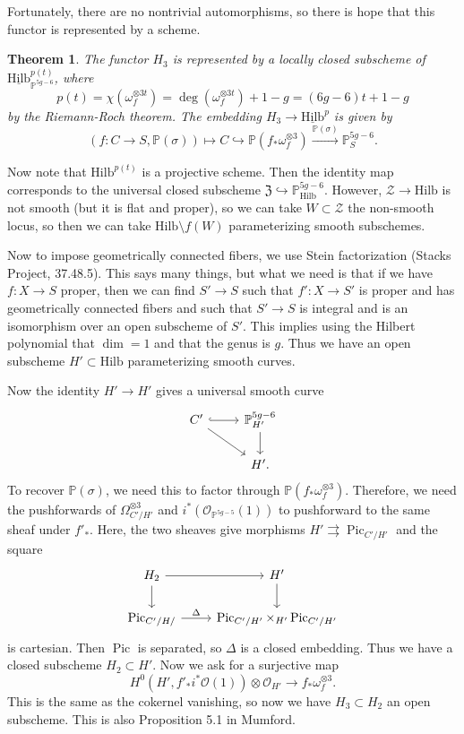 \documentclass[leqno, openany]{memoir}
\newtheorem{thm}{Theorem}[section]
\theoremstyle{definition}
\theoremstyle{remark}
\theoremstyle{plain}
\theoremstyle{definition}
\theoremstyle{remark}
\renewcommand{\P}{\mathbb{P}}
\newcommand{\mc}[1]{\mathcal{#1}}
\newcommand{\mf}[1]{\mathfrak{#1}}
\newcommand{\mr}[1]{\mathrm{#1}}
\newcommand{\ul}[1]{\underline{#1}}
\DeclareMathOperator{\Pic}{Pic}
\begin{document}
Fortunately, there are no nontrivial automorphisms, so there is hope that this functor is represented by a scheme.

\begin{thm}
    The functor $H_3$ is represented by a locally closed subscheme of $\ul{\mr{Hilb}}_{\P^{5g-6}}^{p(t)}$, where 
    \[ p(t) = \chi(\omega_f^{\otimes 3t}) = \deg(\omega_f^{\otimes 3t}) + 1 - g = (6g-6)t + 1-g\]  
    by the Riemann-Roch theorem. The embedding $H_3 \to \ul{\mr{Hilb}}^p$ is given by
    \[ (f \colon C \to S, \P(\sigma)) \mapsto C \hookrightarrow \P(f_* \omega_f^{\otimes 3}) \xrightarrow{\P(\sigma)} \P_S^{5g-6}. \]
\end{thm}

Now note that $\mr{Hilb}^{p(t)}$ is a projective scheme. Then the identity map corresponds to the universal closed subscheme $\mf{Z} \hookrightarrow \P^{5g-6}_{\mr{Hilb}}$. However, $\mc{Z} \to \mr{Hilb}$ is not smooth (but it is flat and proper), so we can take $W \subset \mc{Z}$ the non-smooth locus, so then we can take $\mr{Hilb} \setminus f(W)$ parameterizing smooth subschemes.

Now to impose geometrically connected fibers, we use Stein factorization (Stacks Project, 37.48.5). This says many things, but what we need is that if we have $f \colon X \to S$ proper, then we can find $S' \to S$ such that $f'\colon X \to S'$ is proper and has geometrically connected fibers and such that $S' \to S$ is integral and is an isomorphism over an open subscheme of $S'$. This implies using the Hilbert polynomial that $\dim = 1$ and that the genus is $g$. Thus we have an open subscheme $H' \subset \mr{Hilb}$ parameterizing smooth curves.

Now the identity $H' \to H'$ gives a universal smooth curve
\begin{equation*}
\begin{tikzcd}
    C' \arrow[hookrightarrow]{r} \arrow{dr} & \P_{H'}^{5g-6} \arrow{d} \\
                                            & H'.
\end{tikzcd}
\end{equation*}
To recover $\P(\sigma)$, we need this to factor through $\P(f_* \omega_f^{\otimes 3})$. Therefore, we need the pushforwards of $\Omega_{C'/H'}^{\otimes 3}$ and $i^*(\mc{O}_{\P^{5g-5}}(1))$ to pushforward to the same sheaf under $f'_*$. Here, the two sheaves give morphisms $H' \rightrightarrows \Pic_{C'/H'}$ and the square
\begin{equation*}
\begin{tikzcd}
    H_2 \arrow{r} \arrow{d} & H' \arrow{d} \\
    \Pic_{C'/H/} \arrow{r}{\Delta} & \Pic_{C'/H'} \times_{H'} \Pic_{C'/H'}
\end{tikzcd}
\end{equation*}
is cartesian. Then $\Pic$ is separated, so $\Delta$ is a closed embedding. Thus we have a closed subscheme $H_2 \subset H'$. Now we ask for a surjective map
\[ H^0(H', f'_* i^* \mc{O}(1)) \otimes \mc{O}_{H'} \to f_* \omega_f^{\otimes 3}. \]
This is the same as the cokernel vanishing, so now we have $H_3 \subset H_2$ an open subscheme. This is also Proposition 5.1 in Mumford.
\end{document}
